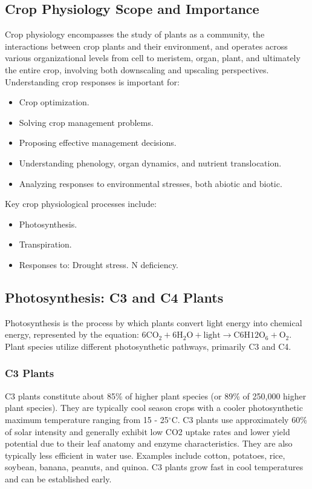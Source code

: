 \subsection{Crop Physiology Scope and Importance} 
Crop physiology encompasses the study of plants as a community, the interactions between crop plants and their environment, and operates across various organizational levels from cell to meristem, organ, plant, and ultimately the entire crop, involving both downscaling and upscaling perspectives.
Understanding crop responses is important for: 
\begin{itemize} 
    \item Crop optimization. 
    \item Solving crop management problems. 
    \item Proposing effective management decisions. 
    \item Understanding phenology, organ dynamics, and nutrient translocation. 
    \item Analyzing responses to environmental stresses, both abiotic and biotic. 
\end{itemize} 

\vspace*{1em}
Key crop physiological processes include: 
\begin{itemize} 
    \item Photosynthesis. 
    \item Transpiration. 
    \item Responses to: 
        \subitem Drought stress. 
        \subitem N deficiency. 
\end{itemize}

\subsection{Photosynthesis: C3 and C4 Plants} 
Photosynthesis is the process by which plants convert light energy into chemical energy, represented by the equation: $\text{6CO}_2 + \text{6H}_2\text{O} + \text{light} \rightarrow \text{C}6\text{H}{12}\text{O}_6 + \text{O}_2$. Plant species utilize different photosynthetic pathways, primarily C3 and C4.

\subsubsection{C3 Plants} 
C3 plants constitute about 85\% of higher plant species (or 89\% of 250,000 higher plant species). They are typically cool season crops with a cooler photosynthetic maximum temperature ranging from 15 - 25$^{\circ}$C. C3 plants use approximately 60\% of solar intensity and generally exhibit low CO2 uptake rates and lower yield potential due to their leaf anatomy and enzyme characteristics. They are also typically less efficient in water use. Examples include cotton, potatoes, rice, soybean, banana, peanuts, and quinoa. C3 plants grow fast in cool temperatures and can be established early.


